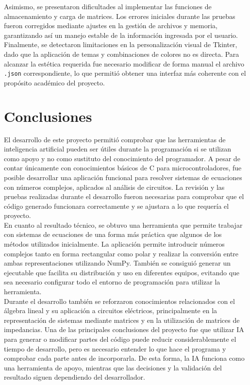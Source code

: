 \documentclass[12pt,a4paper]{article}
\begin{document}
Asimismo, se presentaron dificultades al implementar las funciones de almacenamiento y carga de matrices. Los errores iniciales durante las pruebas fueron corregidos mediante ajustes en la gestión de archivos y memoria, garantizando así un manejo estable de la información ingresada por el usuario. \\

Finalmente, se detectaron limitaciones en la personalización visual de Tkinter, dado que la aplicación de temas y combinaciones de colores no es directa. Para alcanzar la estética requerida fue necesario modificar de forma manual el archivo \texttt{.json} correspondiente, lo que permitió obtener una interfaz más coherente con el propósito académico del proyecto.


\section{Conclusiones}

El desarrollo de este proyecto permitió comprobar que las herramientas de inteligencia artificial pueden ser útiles durante la programación si se utilizan como apoyo y no como sustituto del conocimiento del programador. A pesar de contar únicamente con conocimientos básicos de C para microcontroladores, fue posible desarrollar una aplicación funcional para resolver sistemas de ecuaciones con números complejos, aplicados al análisis de circuitos. La revisión y las pruebas realizadas durante el desarrollo fueron necesarias para comprobar que el código generado funcionara correctamente y se ajustara a lo que requería el proyecto. \\

En cuanto al resultado técnico, se obtuvo una herramienta que permite trabajar con sistemas de ecuaciones de una forma más práctica que algunos de los métodos utilizados inicialmente. La aplicación permite introducir números complejos tanto en forma rectangular como polar y realizar la conversión entre ambas representaciones utilizando NumPy. También se consiguió generar un ejecutable que facilita su distribución y uso en diferentes equipos, evitando que sea necesario configurar todo el entorno de programación para utilizar la herramienta. \\

Durante el desarrollo también se reforzaron conocimientos relacionados con el álgebra lineal y su aplicación a circuitos eléctricos, principalmente en la representación de sistemas mediante matrices y en la utilización de matrices de impedancias. Una de las principales conclusiones del proyecto fue que utilizar IA para generar o modificar partes del código puede reducir considerablemente el tiempo de desarrollo, pero es necesario entender lo que hace el programa y comprobar cada parte antes de incorporarla. De esta forma, la IA funciona como una herramienta de apoyo, mientras que las decisiones y la validación del resultado siguen dependiendo del desarrollador. \\
\end{document}

